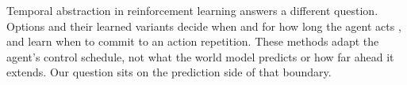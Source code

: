 Temporal abstraction in reinforcement learning answers a different question. Options and their learned variants decide when and for how long the agent acts \citep{sutton1999options,bacon2017optioncritic}, and \citet{biedenkapp2021temporl} learn when to commit to an action repetition. These methods adapt the agent's control schedule, not what the world model predicts or how far ahead it extends. Our question sits on the prediction side of that boundary.

